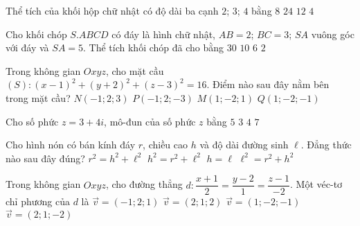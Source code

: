 \begin{ex}%
	Thể tích của khối hộp chữ nhật có độ dài ba cạnh $2$; $3$; $4$ bằng
	\choice
	{$8$}
	{\True $24$}
	{$12$}
	{$4$}
\end{ex}

\begin{ex}%
	Cho khối chóp $S.ABCD$ có đáy là hình chữ nhật, $AB=2$; $BC=3$; $SA$ vuông góc với đáy và $SA=5$. Thể tích khối chóp đã cho bằng
	\choice
	{$30$}
	{\True $10$}
	{$6$}
	{$2$}
\end{ex}

\begin{ex}%
	Trong không gian $Oxyz$, cho mặt cầu $(S) \colon (x-1)^2+(y+2)^2+(z-3)^2=16$. Điểm nào sau đây nằm bên trong mặt cầu?
	\choice
	{$N(-1;2;3)$}
	{$P(-1;2;-3)$}
	{\True $M(1;-2;1)$}
	{$Q(1;-2;-1)$}
\end{ex}

\begin{ex}%
	Cho số phức $z=3+4i$, mô-đun của số phức $z$ bằng
	\choice
	{\True $5$}
	{$3$}
	{$4$}
	{$7$}
\end{ex}

\begin{ex}%
	Cho hình nón có bán kính đáy $r$, chiều cao $h$ và độ dài đường sinh $\ell$. Đẳng thức nào sau đây đúng?
	\choice
	{$r^2=h^2+\ell^2$}
	{$h^2=r^2+\ell^2$}
	{$h=\ell$}
	{\True $\ell^2=r^2+h^2$}
\end{ex}

\begin{ex}%
	Trong không gian $Oxyz$, cho đường thẳng $d \colon \dfrac{x+1}{2}=\dfrac{y-2}{1}=\dfrac{z-1}{-2}$. Một véc-tơ chỉ phương của $d$ là
	\choice
	{$\overrightarrow{v}=(-1;2;1)$}
	{$\overrightarrow{v}=(2;1;2)$}
	{$\overrightarrow{v}=(1;-2;-1)$}
	{\True $\overrightarrow{v}=(2;1;-2)$}
\end{ex}

